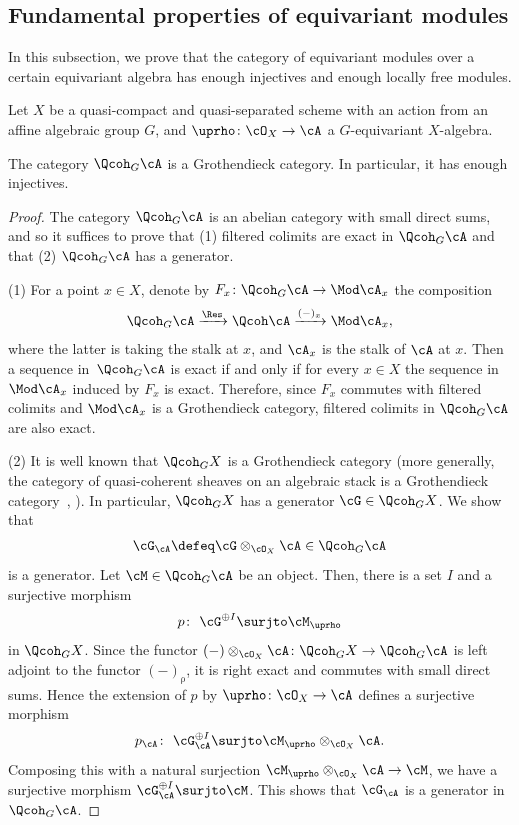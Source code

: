 \subsection{Fundamental properties of equivariant modules} In this subsection, we prove that the category of equivariant modules over a certain equivariant algebra has enough injectives and enough locally free modules.

Let $X$ be a quasi-compact and quasi-separated scheme with an action from an affine algebraic group $G$, and $\uprho\colon \cO_X\to\cA$ a $G$-equivariant $X$-algebra.

\begin{prop}\label{grothen prop}
 The category $\Qcoh_G\cA$ is a Grothendieck category. In particular, it has enough injectives.
\begin{proof}
The category $\Qcoh_G\cA$ is an abelian category with small direct sums, and so it suffices to prove that (1) filtered colimits are exact in $\Qcoh_G\cA$ and that (2) $\Qcoh_G\cA$ has a generator.

(1) For a point $x\in X$, denote by $F_x\colon \Qcoh_G\cA\to \Mod\cA_x$ the composition
\begin{gather*}
\Qcoh_G\cA\xrightarrow{\Res}\Qcoh\cA\xrightarrow{(-)_x}\Mod\cA_x,
\end{gather*}
where the latter is taking the stalk at $x$, and $\cA_x$ is the stalk of $\cA$ at $x$. Then a sequence in~$\Qcoh_G\cA$ is exact if and only if for every $x\in X$ the sequence in $\Mod\cA_x$ induced by $F_x$ is exact. Therefore, since $F_x$ commutes with filtered colimits and $\Mod \cA_x$ is a Grothendieck category, filtered colimits in $\Qcoh_G\cA$ are also exact.

(2)
It is well known that $\Qcoh_GX$ is a Grothendieck category (more generally, the category of quasi-coherent sheaves on an algebraic stack is a Grothendieck category~\cite[Proposition~14.2; 0781]{stacks}, \cite[Corollary~5.10]{tlrv}). In particular, $\Qcoh_GX$ has a generator $\cG\in \Qcoh_G X$. We show that
\begin{gather*}\cG_{\cA}\defeq\cG\otimes_{\cO_X}\cA\in \Qcoh_G \cA\end{gather*} is a generator. Let $\cM\in\Qcoh_G\cA$ be an object. Then, there is a set $I$ and a surjective morphism
\begin{gather*}
p\colon\ \cG^{\oplus I}\surjto \cM_{\uprho}
\end{gather*}
in $\Qcoh_G X$. Since the functor $(-)\otimes_{\cO_X}\cA\colon \Qcoh_G X\to \Qcoh_G\cA$ is left adjoint to the functor $(-)_{\uprho}$, it is right exact and commutes with small direct sums. Hence the extension of $p$ by $\uprho\colon \cO_X\to \cA$ defines a surjective morphism
\begin{gather*}
p_{\cA}\colon\ \cG_{\cA}^{\oplus I}\surjto \cM_{\uprho}\otimes_{\cO_X}\cA.
\end{gather*}
Composing this with a natural surjection $\cM_{\uprho}\otimes_{\cO_X}\cA\to \cM$, we have a surjective morphism $\cG_{\cA}^{\oplus I}\surjto \cM$. This shows that $\cG_{\cA}$ is a generator in $\Qcoh_G \cA$.
\end{proof}
\end{prop}





